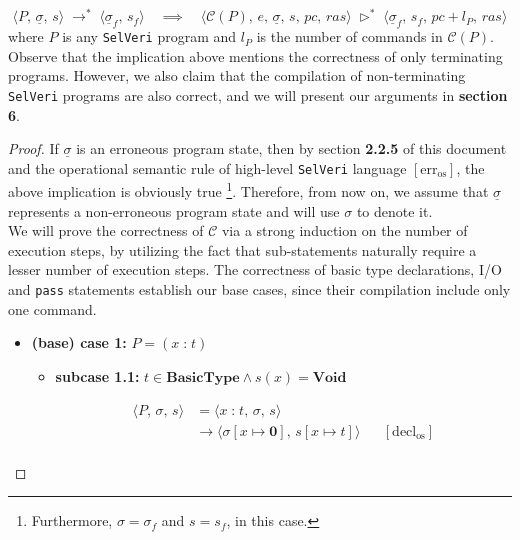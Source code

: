 \documentclass{article}
\begin{document}
\[
\langle P,\, \underline{\sigma},\, s \rangle \; \rightarrow^{\ast} \; \langle \underline{\sigma}_f,\, s_f \rangle \quad \implies \quad 
\langle \mathcal{C}(P),\, e,\, \underline{\sigma},\, s,\, pc,\, ras \rangle \; \triangleright^{\ast} \; \langle \underline{\sigma}_f,\, s_f,\, pc + l_P,\, ras \rangle 
\] where $P$ is any \texttt{SelVeri} program and $l_P$ is the number of commands in $\mathcal{C}(P)$. \\

Observe that the implication above mentions the correctness of only terminating programs. However, we also claim that the compilation of non-terminating \texttt{SelVeri} programs are also correct, and we will present our arguments in \textbf{section 6}.

\begin{proof}
If $\underline{\sigma}$ is an erroneous program state, then by section \textbf{2.2.5} of this document and the operational semantic rule of high-level \texttt{SelVeri} language $[ \text{err}_{\text{os}} ]$, the above implication is obviously true \footnote{Furthermore, $\sigma = \sigma_f$ and $s = s_f$, in this case.}.  Therefore, from now on, we assume that $\underline{\sigma}$ represents a non-erroneous program state and will use $\sigma$ to denote it. \\

We will prove the correctness of $\mathcal{C}$ via a strong induction on the number of execution steps, by utilizing the fact that sub-statements naturally require a lesser number of execution steps. The correctness of basic type declarations, I/O and \texttt{pass} statements establish our base cases, since their compilation include only one command.

\newpage
\begin{itemize}
    \item \textbf{(base) case 1:} $P = (x \;\texttt{:}\; t)$

        \begin{itemize}
            \item \textbf{subcase 1.1:} $t \in \textbf{BasicType} \land s(x) = \textbf{Void}$

            \[
              \begin{aligned}
              \langle P,\, \sigma,\, s \rangle
              &=\langle x \;\texttt{:}\; t,\, \sigma,\, s \rangle \\
              &\rightarrow \langle \sigma[x \mapsto \textbf{0}] ,\, s[x \mapsto t] \rangle
              && [ \text{decl}_{\text{os}} ] \\   
              \end{aligned}
          \]
          

\end{itemize}
\end{itemize}
\end{proof}
\end{document}
